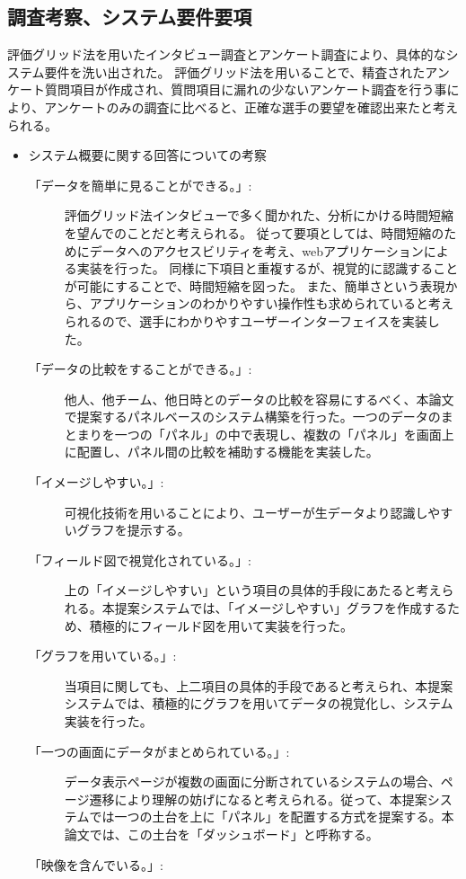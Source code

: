 \documentclass[sotsuron]{kuee}
\begin{document}
\subsection{調査考察、システム要件要項}
評価グリッド法を用いたインタビュー調査とアンケート調査により、具体的なシステム要件を洗い出された。
評価グリッド法を用いることで、精査されたアンケート質問項目が作成され、質問項目に漏れの少ないアンケート調査を行う事により、アンケートのみの調査に比べると、正確な選手の要望を確認出来たと考えられる。
\begin{itemize}
	\item システム概要に関する回答についての考察
		\begin{description}
			\item [「データを簡単に見ることができる。」:]
			評価グリッド法インタビューで多く聞かれた、分析にかける時間短縮を望んでのことだと考えられる。
			従って要項としては、時間短縮のためにデータへのアクセスビリティを考え、webアプリケーションによる実装を行った。
			同様に下項目と重複するが、視覚的に認識することが可能にすることで、時間短縮を図った。
			また、簡単さという表現から、アプリケーションのわかりやすい操作性も求められていると考えられるので、選手にわかりやすユーザーインターフェイスを実装した。
			\item [「データの比較をすることができる。」:]
			他人、他チーム、他日時とのデータの比較を容易にするべく、本論文で提案するパネルベースのシステム構築を行った。一つのデータのまとまりを一つの「パネル」の中で表現し、複数の「パネル」を画面上に配置し、パネル間の比較を補助する機能を実装した。
			\item [「イメージしやすい。」:]
			可視化技術を用いることにより、ユーザーが生データより認識しやすいグラフを提示する。
			\item [「フィールド図で視覚化されている。」:]
			上の「イメージしやすい」という項目の具体的手段にあたると考えられる。本提案システムでは、「イメージしやすい」グラフを作成するため、積極的にフィールド図を用いて実装を行った。
			\item [「グラフを用いている。」:]
			当項目に関しても、上二項目の具体的手段であると考えられ、本提案システムでは、積極的にグラフを用いてデータの視覚化し、システム実装を行った。
			\item [「一つの画面にデータがまとめられている。」:]
			データ表示ページが複数の画面に分断されているシステムの場合、ページ遷移により理解の妨げになると考えられる。従って、本提案システムでは一つの土台を上に「パネル」を配置する方式を提案する。本論文では、この土台を「ダッシュボード」と呼称する。
			\item [「映像を含んでいる。」:]

\end{description}
\end{itemize}
\end{document}
